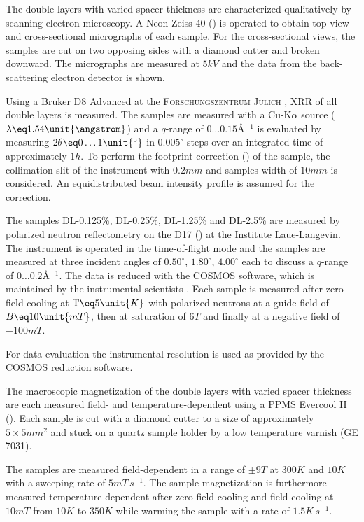 \documentclass[\main/dresen_thesis.tex]{subfiles}
\begin{document}
    The double layers with varied spacer thickness are characterized qualitatively by scanning electron microscopy.
    A Neon Zeiss 40 () is operated to obtain top-view and cross-sectional micrographs of each sample.
    For the cross-sectional views, the samples are cut on two opposing sides with a diamond cutter and broken downward.
    The micrographs are measured at $5 \unit{kV}$ and the data from the back-scattering electron detector is shown.

    Using a Bruker D8 Advanced at the \textsc{Forschungszentrum J\"ulich} , XRR of all double layers is measured.
    The samples are measured with a Cu-K$\alpha$ source ($\lambda \eq 1.54 \unit{\angstrom}$) and a $q$-range of $0 \ldots 0.15 \unit{\angstrom^{-1}}$ is evaluated by measuring $2 \theta \eq 0 \ldots 1 \unit{^\circ}$ in $0.005 \unit{^\circ}$ steps over an integrated time of approximately $1 \unit{h}$.
    To perform the footprint correction () of the sample, the collimation slit of the instrument with $0.2 \unit{mm}$ and samples width of $10 \unit{mm}$ is considered.
    An equidistributed beam intensity profile is assumed for the correction.

    The samples DL-0.125\%, DL-0.25\%, DL-1.25\% and DL-2.5\% are measured by polarized neutron reflectometry on the D17 () at the Institute Laue-Langevin.
    The instrument is operated in the time-of-flight mode and the samples are measured at three incident angles of $0.50^\circ ,\, 1.80^\circ ,\, 4.00^\circ$ each to discuss a $q$-range of $0 \ldots 0.2 \unit{\angstrom^{-1}}$.
    The data is reduced with the COSMOS software, which is maintained by the instrumental scientists \cite{Gutfreund_2018_Towar}.
    Each sample is measured after zero-field cooling at $\mathrm{T} \eq 5 \unit{K}$ with polarized neutrons at a guide field of $B \eq 10 \unit{mT}$, then at saturation of $6 \unit{T}$ and finally at a negative field of $-100 \unit{mT}$.

    For data evaluation the instrumental resolution is used as provided by the COSMOS reduction software.

    The macroscopic magnetization of the double layers with varied spacer thickness are each measured field- and temperature-dependent using a PPMS Evercool II ().
    Each sample is cut with a diamond cutter to a size of approximately $5 \times 5 \unit{mm^2}$ and stuck on a quartz sample holder by a low temperature varnish (GE 7031).

    The samples are measured field-dependent in a range of $\pm 9 \unit{T}$ at $300 \unit{K}$ and $10 \unit{K}$ with a sweeping rate of $5 \unit{mT \, s^{-1}}$.
    The sample magnetization is furthermore measured temperature-dependent after zero-field cooling and field cooling at $10 \unit{mT}$ from $10 \unit{K}$ to $350 \unit{K}$ while warming the sample with a rate of $1.5 \unit{K \, s^{-1}}$.
\end{document}
